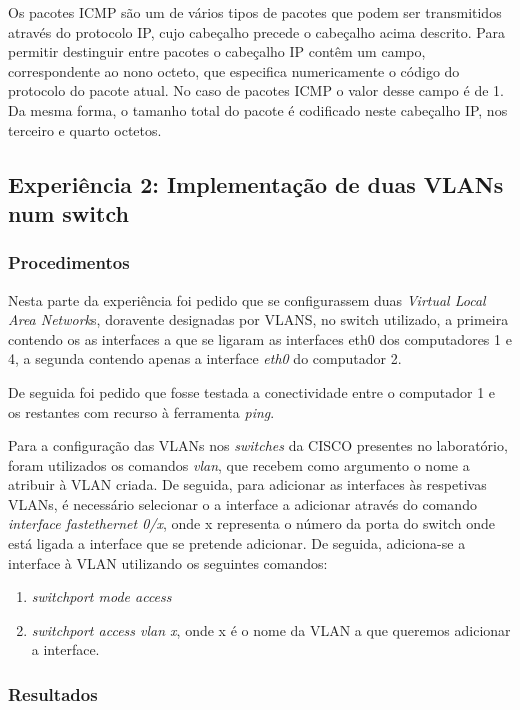 \documentclass{article}
\begin{document}
Os pacotes ICMP são um de vários tipos de pacotes que podem ser transmitidos através do protocolo IP, cujo cabeçalho precede o cabeçalho acima descrito. Para permitir destinguir entre pacotes o cabeçalho IP contêm um campo, correspondente ao nono octeto, que especifica numericamente o código do protocolo do pacote atual. No caso de pacotes ICMP o valor desse campo é de 1. Da mesma forma, o tamanho total do pacote é codificado neste cabeçalho IP, nos terceiro e quarto octetos.

\newpage
\subsection{Experiência 2: Implementação de duas VLANs num switch}
\subsubsection{Procedimentos}
Nesta parte da experiência foi pedido que se configurassem duas \textit{Virtual Local Area Network}s, doravente designadas por VLANS, no switch utilizado, a primeira contendo os as interfaces a que se ligaram as interfaces eth0 dos computadores 1 e 4, a segunda contendo apenas a interface \textit{eth0} do computador 2.

De seguida foi pedido que fosse testada a conectividade entre o computador 1 e os restantes com recurso à ferramenta \textit{ping}.

Para a configuração das VLANs nos \textit{switches} da CISCO presentes no laboratório, foram utilizados os comandos \textit{vlan}, que recebem como argumento o nome a atribuir à VLAN criada. De seguida, para adicionar as interfaces às respetivas VLANs, é necessário selecionar o a interface a adicionar através do comando \textit{interface fastethernet 0/x}, onde x representa o número da porta do switch onde está ligada a interface que se pretende adicionar. De seguida, adiciona-se a interface à VLAN utilizando os seguintes comandos:
\begin{enumerate}
\item \textit{switchport mode access}
\item \textit{switchport access vlan x}, onde x é o nome da VLAN a que queremos adicionar a interface.
\end{enumerate}


\subsubsection{Resultados}
\end{document}
